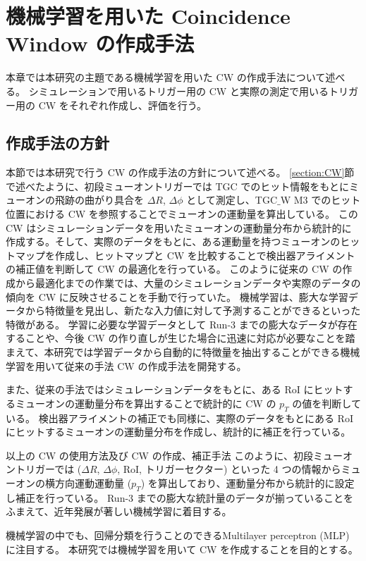 \chapter{機械学習を用いた Coincidence Window の作成手法}
本章では本研究の主題である機械学習を用いた CW の作成手法について述べる。
シミュレーションで用いるトリガー用の CW と実際の測定で用いるトリガー用の CW をそれぞれ作成し、評価を行う。

\section{作成手法の方針}
本節では本研究で行う CW の作成手法の方針について述べる。
\ref{section:CW}節で述べたように、初段ミューオントリガーでは TGC でのヒット情報をもとにミューオンの飛跡の曲がり具合を $\Delta R$, $\Delta \phi$ として測定し、TGC$\_$W M3 でのヒット位置における CW を参照することでミューオンの運動量を算出している。
この CW はシミュレーションデータを用いたミューオンの運動量分布から統計的に作成する。そして、実際のデータをもとに、ある運動量を持つミューオンのヒットマップを作成し、ヒットマップと CW を比較することで検出器アライメントの補正値を判断して CW の最適化を行っている。
このように従来の CW の作成から最適化までの作業では、大量のシミュレーションデータや実際のデータの傾向を CW に反映させることを手動で行っていた。
機械学習は、膨大な学習データから特徴量を見出し、新たな入力値に対して予測することができるといった特徴がある。
学習に必要な学習データとして Run-3 までの膨大なデータが存在することや、今後 CW の作り直しが生じた場合に迅速に対応が必要なことを踏まえて、本研究では学習データから自動的に特徴量を抽出することができる機械学習を用いて従来の手法 CW の作成手法を開発する。








また、従来の手法ではシミュレーションデータをもとに、ある RoI にヒットするミューオンの運動量分布を算出することで統計的に CW の $p_T$ の値を判断している。
検出器アライメントの補正でも同様に、実際のデータをもとにある RoI にヒットするミューオンの運動量分布を作成し、統計的に補正を行っている。

以上の CW の使用方法及び CW の作成、補正手法
このように、初段ミューオントリガーでは ($\Delta R$, $\Delta \phi$, RoI, トリガーセクター) といった 4 つの情報からミューオンの横方向運動運動量 ($p_T$) を算出しており、運動量分布から統計的に設定し補正を行っている。
Run-3 までの膨大な統計量のデータが揃っていることをふまえて、近年発展が著しい機械学習に着目する。

機械学習の中でも、回帰分類を行うことのできるMultilayer perceptron (MLP) に注目する。
本研究では機械学習を用いて CW を作成することを目的とする。

